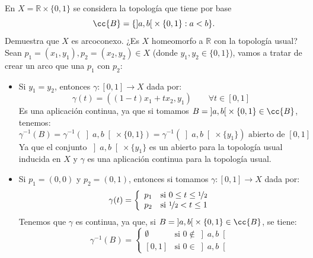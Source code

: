 \begin{ejercicio}
    En $X=\mathbb{R}\times \{0,1\}$ se considera la topología que tiene por base
    \begin{equation*}
        \cc{B} = \{\left]a,b\right[\times \{0,1\} : a<b\}.
    \end{equation*}
    Demuestra que $X$ es arcoconexo. ¿Es $X$ homeomorfo a $\mathbb{R}$ con la topología usual?\\

    \noindent
    Sean $p_1=(x_1,y_1),p_2=(x_2,y_2)\in X$ (donde $y_1, y_2\in \{0,1\}$), vamos a tratar de crear un arco que una $p_1$ con $p_2$:
    \begin{itemize}
        \item Si $y_1=y_2$, entonces $\gamma:[0,1]\to X$ dada por:
            \begin{equation*}
                \gamma(t) = ((1-t)x_1 + tx_2, y_1) \qquad \forall t\in [0,1]
            \end{equation*}
            Es una aplicación continua, ya que si tomamos $B = \left]a,b\right[\times \{0,1\}\in \cc{B}$, tenemos:
            \begin{equation*}
                \gamma^{-1}(B) = \gamma^{-1}(\left]a,b\right[\times \{0,1\}) = \gamma^{-1}(\left]a,b\right[\times \{y_1\}) \text{\ abierto de\ } [0,1]
            \end{equation*}
            Ya que el conjunto $\left]a,b\right[\times \{y_1\}$ es un abierto para la topología usual inducida en $X$ y $\gamma$ es una aplicación continua para la topología usual.
        \item Si $p_1 = (0,0)$ y $p_2 = (0,1)$, entonces si tomamos $\gamma:[0,1]\to X$ dada por:
            \begin{equation*}
                \gamma(t) = \left\{\begin{array}{ll}
                        p_1 & \text{si\ } 0 \leq t \leq \nicefrac{1}{2}\\
                        p_2 & \text{si\ } \nicefrac{1}{2}<t \leq 1
                \end{array}\right.
            \end{equation*}
            Tenemos que $\gamma$ es continua, ya que, si $B = \left]a,b\right[\times \{0,1\}\in \cc{B}$, se tiene:
            \begin{equation*}
                \gamma^{-1}(B) = \left\{\begin{array}{cl}
                        \emptyset & \text{si\ } 0 \notin \left]a,b\right[ \\
                        \left[0,1\right] & \text{si\ } 0 \in \left]a,b\right[
                \end{array}\right.
            \end{equation*}


\end{itemize}
\end{ejercicio}
